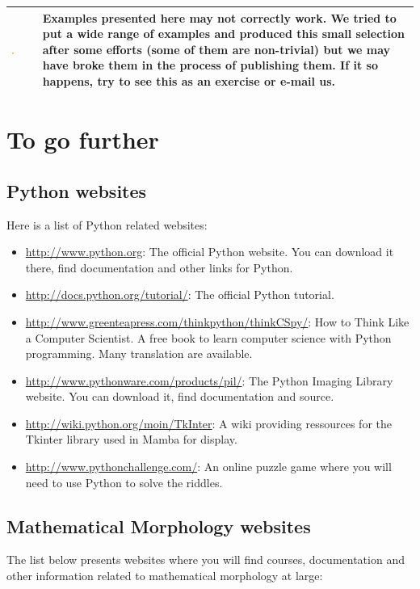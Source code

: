 \documentclass[a4paper,10pt,oneside]{article}
\newenvironment{warnBox}
{
    \begin{center}
    \begin{tabular}{ | b{0.1\textwidth} b{0.8\textwidth} | }
    \hline
    \rowcolor{yellow}
    \includegraphics[width=0.1\textwidth]{Crystal_Clear_app_error.png} &
}
{
    \\
    \hline
    \end{tabular}
    \end{center}
}
\begin{document}
\begin{warnBox}
Examples presented here may not correctly work. We tried to put a wide range of
examples and produced this small selection after some efforts (some of them are
non-trivial) but we may have broke them in the process of publishing them. If
it so happens, try to see this as an exercise or e-mail us.
\end{warnBox}

\pagebreak



\pagebreak

\section{To go further}
\label{cha:to_go_further}
\subsection{Python websites}

Here is a list of Python related websites:

\begin{itemize}
\item \url{http://www.python.org}: The official Python website. You can download
it there, find documentation and other links for Python.
\item \url{http://docs.python.org/tutorial/}: The official Python tutorial.
\item \url{http://www.greenteapress.com/thinkpython/thinkCSpy/}: How to Think 
Like a Computer Scientist. A free book to learn computer science with Python
programming. Many translation are available.
\item \url{http://www.pythonware.com/products/pil/}: The Python Imaging Library
website. You can download it, find documentation and source.
\item \url{http://wiki.python.org/moin/TkInter}: A wiki providing ressources
for the Tkinter library used in Mamba for display.
\item \url{http://www.pythonchallenge.com/}: An online puzzle game where you
will need to use Python to solve the riddles.
\end{itemize}

\subsection{Mathematical Morphology websites}

The list below presents websites where you will find courses, documentation and
other information related to mathematical morphology at large:
\end{document}
